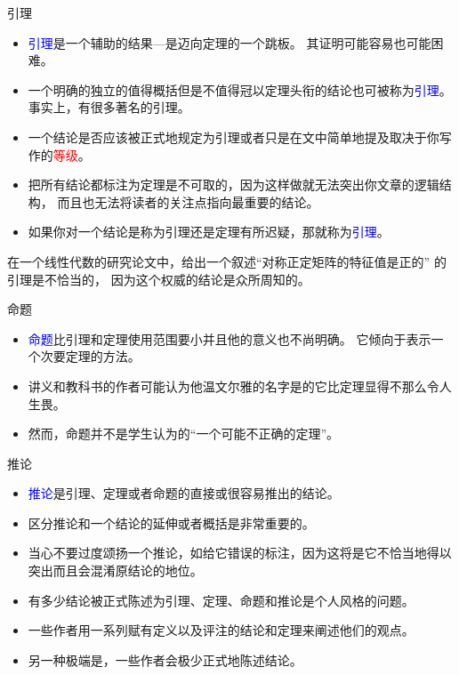 \documentclass[13pt]{ctexbeamer}
\newcommand{\red}[1]{\textcolor{red}{#1}}
\newcommand{\blue}[1]{\textcolor{blue}{#1}}
\begin{document}
\begin{frame}{引理}
	
\begin{itemize}
	\item 
	\blue{引理}是一个辅助的结果—是迈向定理的一个跳板。
	其证明可能容易也可能困难。
	
\item 一个明确的独立的值得概括但是不值得冠以定理头衔的结论也可被称为\blue{引理}。
事实上，有很多著名的引理。
\item 
	一个结论是否应该被正式地规定为引理或者只是在文中简单地提及取决于你写作的\red{等级}。
\item 
\alert{把所有结论都标注为定理是不可取的}，因为这样做就无法突出你文章的逻辑结构，
而且也无法将读者的关注点指向最重要的结论。
\item 如果你对一个结论是称为引理还是定理有所迟疑，那就称为\blue{引理}。
\end{itemize}


在一个线性代数的研究论文中，给出一个叙述``对称正定矩阵的特征值是正的'' 的引理是不恰当的， 
因为这个权威的结论是众所周知的。

\end{frame}


\begin{frame}{命题}
\begin{itemize}
	\item 
\blue{命题}比引理和定理使用范围要小并且他的意义也不尚明确。
它倾向于表示一个次要定理的方法。
\item 讲义和教科书的作者可能认为他温文尔雅的名字是的它比定理显得不那么令人生畏。
 \item 然而，命题并不是学生认为的“一个可能不正确的定理”。
\end{itemize}
\end{frame}

\begin{frame}{推论}
\begin{itemize}
\item \blue{推论}是引理、定理或者命题的直接或很容易推出的结论。
\item 区分推论和一个结论的延伸或者概括是非常重要的。
\item 当心不要过度颂扬一个推论，如给它错误的标注，因为这将是它不恰当地得以突出而且会混淆原结论的地位。
\end{itemize}
\end{frame}

\begin{frame}
\begin{itemize}
\item 有多少结论被正式陈述为引理、定理、命题和推论是个人风格的问题。
\item 一些作者用一系列赋有定义以及评注的结论和定理来阐述他们的观点。
\item 另一种极端是，一些作者会极少正式地陈述结论。
\end{itemize}
\end{frame}
\end{document}
